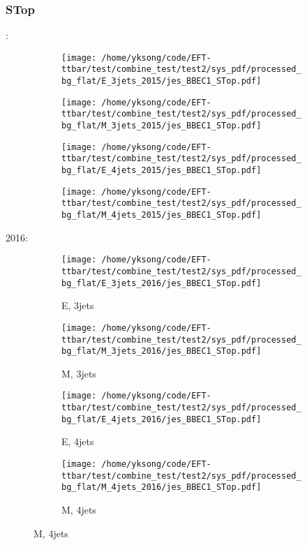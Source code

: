 \documentclass{beamer}
\begin{document}
\begin{frame}
\frametitle{STop}
\fontsize{5}{1}:
\begin{figure}
\centering
\begin{subfigure}[b]{0.24\textwidth}
\texttt{[image: /home/yksong/code/EFT-ttbar/test/combine\_test/test2/sys\_pdf/processed\_bg\_flat/E\_3jets\_2015/jes\_BBEC1\_STop.pdf]}
\end{subfigure}
\begin{subfigure}[b]{0.24\textwidth}
\texttt{[image: /home/yksong/code/EFT-ttbar/test/combine\_test/test2/sys\_pdf/processed\_bg\_flat/M\_3jets\_2015/jes\_BBEC1\_STop.pdf]}
\end{subfigure}
\begin{subfigure}[b]{0.24\textwidth}
\texttt{[image: /home/yksong/code/EFT-ttbar/test/combine\_test/test2/sys\_pdf/processed\_bg\_flat/E\_4jets\_2015/jes\_BBEC1\_STop.pdf]}
\end{subfigure}
\begin{subfigure}[b]{0.24\textwidth}
\texttt{[image: /home/yksong/code/EFT-ttbar/test/combine\_test/test2/sys\_pdf/processed\_bg\_flat/M\_4jets\_2015/jes\_BBEC1\_STop.pdf]}
\end{subfigure}
\end{figure}
2016:
\begin{figure}
\centering
\begin{subfigure}[b]{0.24\textwidth}
\texttt{[image: /home/yksong/code/EFT-ttbar/test/combine\_test/test2/sys\_pdf/processed\_bg\_flat/E\_3jets\_2016/jes\_BBEC1\_STop.pdf]}
\captionsetup{font=tiny}
\caption{E, 3jets}
\end{subfigure}
\begin{subfigure}[b]{0.24\textwidth}
\texttt{[image: /home/yksong/code/EFT-ttbar/test/combine\_test/test2/sys\_pdf/processed\_bg\_flat/M\_3jets\_2016/jes\_BBEC1\_STop.pdf]}
\captionsetup{font=tiny}
\caption{M, 3jets}
\end{subfigure}
\begin{subfigure}[b]{0.24\textwidth}
\texttt{[image: /home/yksong/code/EFT-ttbar/test/combine\_test/test2/sys\_pdf/processed\_bg\_flat/E\_4jets\_2016/jes\_BBEC1\_STop.pdf]}
\captionsetup{font=tiny}
\caption{E, 4jets}
\end{subfigure}
\begin{subfigure}[b]{0.24\textwidth}
\texttt{[image: /home/yksong/code/EFT-ttbar/test/combine\_test/test2/sys\_pdf/processed\_bg\_flat/M\_4jets\_2016/jes\_BBEC1\_STop.pdf]}
\captionsetup{font=tiny}
\caption{M, 4jets}
\end{subfigure}
\end{figure}
\end{frame}
\end{document}
